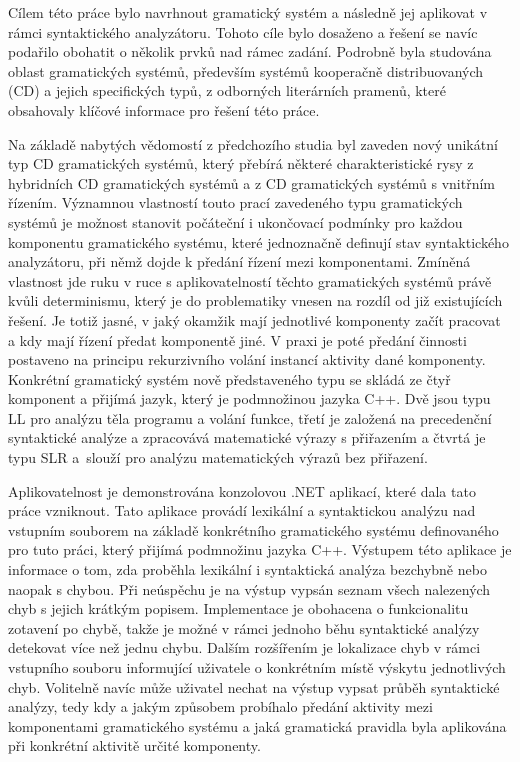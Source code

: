 Cílem této práce bylo navrhnout gramatický systém a následně jej aplikovat v rámci syntaktického analyzátoru. Tohoto cíle bylo dosaženo a řešení se navíc podařilo obohatit o několik
prvků nad rámec zadání. Podrobně byla studována oblast gramatických systémů, především systémů kooperačně distribuovaných (CD) a jejich specifických typů, z odborných literárních pramenů, které
obsahovaly klíčové informace pro řešení této práce.

Na základě nabytých vědomostí z předchozího studia byl zaveden nový unikátní typ CD gramatických systémů, který přebírá některé charakteristické rysy z hybridních CD gramatických systémů a
z CD gramatických systémů s vnitřním řízením. Významnou vlastností touto prací zavedeného typu gramatických systémů je možnost stanovit počáteční i ukončovací podmínky pro každou komponentu
gramatického systému, které jednoznačně definují stav syntaktického analyzátoru, při němž dojde k předání řízení mezi komponentami. Zmíněná vlastnost jde ruku v ruce s aplikovatelností
těchto gramatických systémů právě kvůli determinismu, který je do problematiky vnesen na rozdíl od již existujících řešení. Je totiž jasné, v jaký okamžik mají jednotlivé komponenty začít pracovat
a kdy mají řízení předat komponentě jiné. V praxi je poté předání činnosti postaveno na principu rekurzivního volání instancí aktivity dané komponenty. Konkrétní gramatický systém nově představeného
typu se skládá ze čtyř komponent a přijímá jazyk, který je podmnožinou jazyka C++.
Dvě jsou typu LL pro analýzu těla programu a volání funkce, třetí je založená na precedenční syntaktické analýze a zpracovává matematické výrazy s přiřazením a
čtvrtá je typu SLR a~slouží pro analýzu matematických výrazů bez přiřazení.

Aplikovatelnost je demonstrována konzolovou .NET aplikací, které dala tato práce vzniknout. Tato aplikace provádí lexikální a syntaktickou analýzu nad vstupním souborem na základě konkrétního gramatického
systému definovaného pro tuto práci, který přijímá podmnožinu jazyka C++. Výstupem této aplikace je informace o tom, zda proběhla lexikální i syntaktická analýza bezchybně nebo naopak s chybou.
Při neúspěchu je na výstup vypsán seznam všech nalezených chyb s jejich krátkým popisem.
Implementace je obohacena o funkcionalitu zotavení po chybě, takže je možné v rámci jednoho běhu syntaktické analýzy detekovat více než jednu chybu. Dalším rozšířením je lokalizace chyb
v rámci vstupního souboru informující uživatele o konkrétním místě výskytu jednotlivých chyb. Volitelně navíc může uživatel nechat na výstup vypsat průběh syntaktické analýzy, tedy kdy a jakým
způsobem probíhalo předání aktivity mezi komponentami gramatického systému a jaká gramatická pravidla byla aplikována při konkrétní aktivitě určité komponenty.

